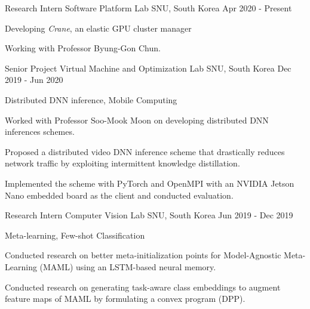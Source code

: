 

\begin{cventries}

  \cventry
    {Research Intern} %
    {Software Platform Lab} %
    {SNU, South Korea} %
    {Apr 2020 - Present} %
    {
      \begin{cvitems} %
        \item {Developing \textit{Crane}, an elastic GPU cluster manager}
        \item {Working with Professor Byung-Gon Chun.}
      \end{cvitems}
    }
    
  \cventry
    {Senior Project} %
    {Virtual Machine and Optimization Lab} %
    {SNU, South Korea} %
    {Dec 2019 - Jun 2020} %
    {
      \begin{cvitems} %
        \item {Distributed DNN inference, Mobile Computing}
        \item {Worked with Professor Soo-Mook Moon on developing distributed DNN inferences schemes.}
        \item {Proposed a distributed video DNN inference scheme that drastically reduces network traffic by exploiting intermittent knowledge distillation.}
        \item {Implemented the scheme with PyTorch and OpenMPI with an NVIDIA Jetson Nano embedded board as the client and conducted evaluation.}
      \end{cvitems}
    }
    
  \cventry
    {Research Intern} %
    {Computer Vision Lab} %
    {SNU, South Korea} %
    {Jun 2019 - Dec 2019} %
    {
      \begin{cvitems} %
        \item {Meta-learning, Few-shot Classification}
        \item {Conducted research on better meta-initialization points for Model-Agnostic Meta-Learning (MAML) using an LSTM-based neural memory.}
        \item {Conducted research on generating task-aware class embeddings to augment feature maps of MAML by formulating a convex program (DPP).}
      \end{cvitems}
    }
    

\end{cventries}
